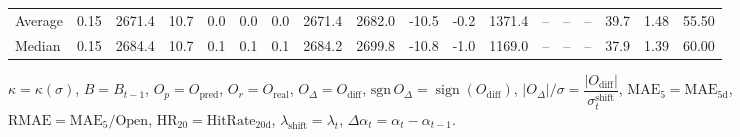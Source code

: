 \begin{threeparttable}
{\begin{tabular}{lrrrrrrrrrrrrrrrrr}
Average &     0.15 & 2671.4 &              10.7 &               0.0 &                0.0 &                0.0 & 2671.4 & 2682.0 &      -10.5 &                     -0.2 &              1371.4 &         -- &        -- &             -- &             39.7 &            1.48 &                  55.50 \\
 Median &     0.15 & 2684.4 &              10.7 &               0.1 &                0.1 &                0.1 & 2684.2 & 2699.8 &      -10.8 &                     -1.0 &              1169.0 &         -- &        -- &             -- &             37.9 &            1.39 &                  60.00 \\
\bottomrule
\end{tabular}
}
\begin{tablenotes}\footnotesize
\item $\kappa=\kappa(\sigma)$, $B=B_{t-1}$, $O_p=O_{\text{pred}}$, $O_r=O_{\text{real}}$, $O_\Delta=O_{\text{diff}}$, $\mathrm{sgn}\,O_\Delta=\operatorname{sign}(O_{\text{diff}})$, $|O_\Delta|/\sigma=\dfrac{|O_{\text{diff}}|}{\sigma_t^{\text{shift}}}$, $\mathrm{MAE}_5=\mathrm{MAE}_{5\text{d}}$, $\mathrm{RMAE}= \mathrm{MAE}_5 / \text{Open}$, $\mathrm{HR}_{20}=\mathrm{HitRate}_{20\text{d}}$, 
$\lambda_{\text{shift}}=\lambda_t$, 
$\Delta\alpha_t=\alpha_t-\alpha_{t-1}$.
\end{tablenotes}
\end{threeparttable}
\endgroup

